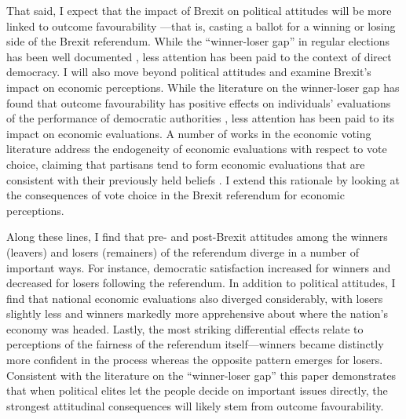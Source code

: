 \documentclass[12pt, letter]{article}
\begin{document}
That said, I expect that the impact of Brexit on political attitudes will be more linked to outcome favourability \parencite{marien2017winner}—that is, casting a ballot for a winning or losing side of the Brexit referendum. While the “winner-loser gap” in regular elections has been well documented \parencite{anderson2005losers}, less attention has been paid to the context of direct democracy. I will also move beyond political attitudes and examine Brexit's impact on economic perceptions. While the literature on the winner-loser gap has found that outcome favourability has positive effects on individuals' evaluations of the performance of democratic authorities \parencite{singh2011winning}, less attention has been paid to its impact on economic evaluations. A number of works in the economic voting literature address the endogeneity of economic evaluations with respect to vote choice, claiming that partisans tend to form economic evaluations that are consistent with their previously held beliefs \parencite{anderson2007end, evans2006political, wlezien1997economic}. I extend this rationale by looking at the consequences of vote choice in the Brexit referendum for economic perceptions. 

Along these lines, I find that pre- and post-Brexit attitudes among the winners (leavers) and losers (remainers) of the referendum diverge in a number of important ways. For instance, democratic satisfaction increased for winners and decreased for losers following the referendum. In addition to political attitudes, I find that national economic evaluations also diverged considerably, with losers slightly less and winners markedly more apprehensive about where the nation’s economy was headed. Lastly, the most striking differential effects relate to perceptions of the fairness of the referendum itself—winners became distinctly more confident in the process whereas the opposite pattern emerges for losers. Consistent with the literature on the “winner-loser gap” this paper demonstrates that when political elites let the people decide on important issues directly, the strongest attitudinal consequences will likely stem from outcome favourability.
\end{document}
